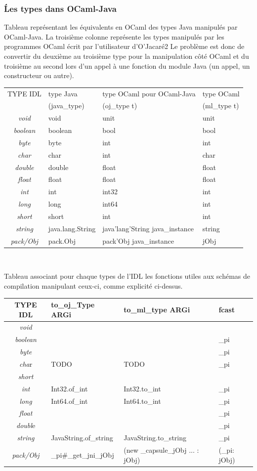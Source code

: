 \documentclass[a4paper, 11pt]{article}
\begin{document}
\subsubsection{\'Les types dans OCaml-Java}
Tableau représentant les équivalents en OCaml des types Java manipulés
par OCaml-Java.
La troisième colonne représente les types manipulés par les programmes
OCaml écrit par l'utilisateur d'O'Jacaré2
Le problème est donc de convertir du deuxième au troisième type pour la manipulation côté OCaml et du troisième au second lors d'un appel à une fonction du module Java (un appel, un constructeur ou autre).

\begin{tabular}{|c|l|l|l|}
 \hline
TYPE IDL &type Java & type OCaml  pour OCaml-Java & type OCaml \\
& (java\_type) & (oj\_type t) & (ml\_type t) \\
 \hline
\emph{void} & void & unit & unit\\
\emph{boolean} &boolean & bool & bool\\
\emph{byte} & byte & int & int \\
\emph{char} &char & int & char\\
\emph{double} & double & float & float\\
\emph{float} & float & float & float\\
\emph{int} & int & int32 & int\\
\emph{long} & long & int64 & int\\
\emph{short} & short & int & int\\
\emph{string} & java.lang.String & java'lang'String java\_instance & string\\
\emph{pack/Obj} & pack.Obj & pack'Obj java\_instance & jObj\\
 \hline
\end{tabular}
\
\newline

Tableau associant pour chaque types de l'IDL les
fonctions utiles aux schémas de compilation manipulant ceux-ci, comme explicité ci-dessus. 

\begin{tabular}{|c|l|l|l|}
  \hline
  TYPE IDL & to\_oj\_Type ARGi & to\_ml\_type ARGi & fcast\\
  \hline
  \emph{void} &   &  & \\
  \emph{boolean} &  &  &\_pi \\
 \emph{byte} & &  &\_pi  \\
 \emph{cha}r & TODO  & TODO & \_pi \\
  \emph{short} & &  & \\
 \emph{int} & Int32.of\_int\ & Int32.to\_int & \_pi\\
 \emph{long} & Int64.of\_int & Int64.to\_int & \_pi\\
 \emph{float} & & &\_pi \\
  \emph{doubl}e & & & \_pi\\
 \emph{string} & JavaString.of\_string & JavaString.to\_string & \_pi\\
 \emph{pack/Obj} & \_pi\#\_get\_jni\_jObj & (new \_capsule\_jObj ... : jObj) & (\_pi: jObj)\\
  \hline
\end{tabular}
\end{document}

